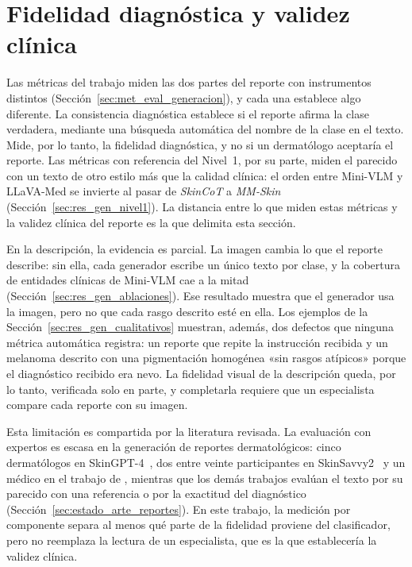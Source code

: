 \section{Fidelidad diagnóstica y validez clínica}
\label{sec:disc_validez_clinica}

Las métricas del trabajo miden las dos partes del reporte con instrumentos distintos
(Sección~\ref{sec:met_eval_generacion}), y cada una establece algo diferente. La consistencia diagnóstica establece si
el reporte afirma la clase verdadera, mediante una búsqueda automática del nombre de la clase en el texto. Mide, por lo
tanto, la fidelidad diagnóstica, y no si un dermatólogo aceptaría el reporte. Las métricas con referencia del
Nivel~1, por su parte, miden el parecido con un texto de otro estilo más que la calidad clínica: el orden entre
Mini-VLM y LLaVA-Med se invierte al pasar de \emph{SkinCoT} a \emph{MM-Skin} (Sección~\ref{sec:res_gen_nivel1}). La
distancia entre lo que miden estas métricas y la validez clínica del reporte es la que delimita esta sección.

En la descripción, la evidencia es parcial. La imagen cambia lo que el reporte describe: sin ella, cada generador
escribe un único texto por clase, y la cobertura de entidades clínicas de Mini-VLM cae a la mitad
(Sección~\ref{sec:res_gen_ablaciones}). Ese resultado muestra que el generador usa la imagen, pero no que cada rasgo
descrito esté en ella. Los ejemplos de la Sección~\ref{sec:res_gen_cualitativos} muestran, además, dos defectos que
ninguna métrica automática registra: un reporte que repite la instrucción recibida y un melanoma descrito con una
pigmentación homogénea «sin rasgos atípicos» porque el diagnóstico recibido era nevo. La fidelidad visual de la
descripción queda, por lo tanto, verificada solo en parte, y completarla requiere que un especialista compare cada
reporte con su imagen.

Esta limitación es compartida por la literatura revisada. La evaluación con expertos es escasa en la generación de
reportes dermatológicos: cinco dermatólogos en SkinGPT-4~\cite{zhou2024pretrained}, dos entre veinte participantes en
SkinSavvy2~\cite{kim2025skinsavvy2} y un médico en el trabajo de \citeauthor{chakrabarti2025skin}, mientras que los
demás trabajos evalúan el texto por su parecido con una referencia o por la exactitud del diagnóstico
(Sección~\ref{sec:estado_arte_reportes}). En este trabajo, la medición por componente separa al menos
qué parte de la fidelidad proviene del clasificador, pero no reemplaza la lectura de un especialista, que es la que
establecería la validez clínica.

